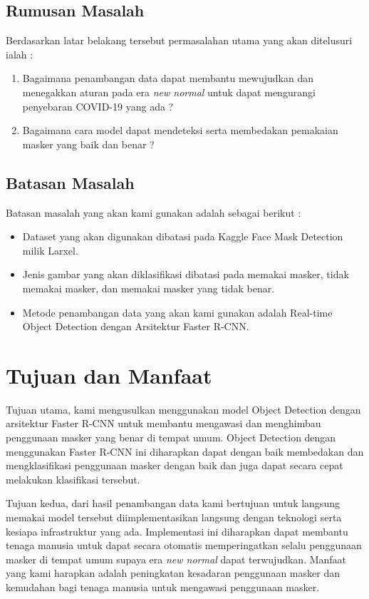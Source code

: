 \documentclass{article}
\begin{document}
  	\subsection{Rumusan Masalah}
  		Berdasarkan latar belakang tersebut permasalahan utama yang akan ditelusuri ialah :
  		\begin{enumerate}
  			\item Bagaimana penambangan data dapat membantu mewujudkan dan menegakkan aturan pada era \textit{new normal} untuk dapat mengurangi penyebaran COVID-19 yang ada ?
  			\item Bagaimana cara model dapat mendeteksi serta membedakan pemakaian masker yang baik dan benar ?

  		\end{enumerate}
  	\subsection{Batasan Masalah}
  		Batasan masalah yang akan kami gunakan adalah sebagai berikut :
  		\begin{itemize}
  			\item Dataset yang akan digunakan dibatasi pada Kaggle Face Mask Detection milik Larxel\cite{larxel_2020}.
  			\item Jenis gambar yang akan diklasifikasi dibatasi pada memakai masker, tidak memakai masker, dan memakai masker yang tidak benar.
  			\item Metode penambangan data yang akan kami gunakan adalah Real-time Object Detection dengan Arsitektur Faster R-CNN\cite{NIPS2015_14bfa6bb}.
  		\end{itemize}
  \section{Tujuan dan Manfaat}
  		\par Tujuan utama, kami mengusulkan menggunakan model Object Detection dengan arsitektur Faster R-CNN untuk membantu mengawasi dan menghimbau penggunaan masker yang benar di tempat umum. Object Detection dengan menggunakan Faster R-CNN ini diharapkan dapat dengan baik membedakan dan mengklasifikasi penggunaan masker dengan baik dan juga dapat secara cepat melakukan klasifikasi tersebut.
  		
  		\par Tujuan kedua, dari hasil penambangan data kami bertujuan untuk langsung memakai model tersebut diimplementasikan langsung dengan teknologi serta kesiapa infrastruktur yang ada. Implementasi ini diharapkan dapat membantu tenaga manusia untuk dapat secara otomatis memperingatkan selalu penggunaan masker di tempat umum supaya era \textit{new normal} dapat terwujudkan. Manfaat yang kami harapkan adalah peningkatan kesadaran penggunaan masker dan kemudahan bagi tenaga manusia untuk mengawasi penggunaan masker.
\end{document}
